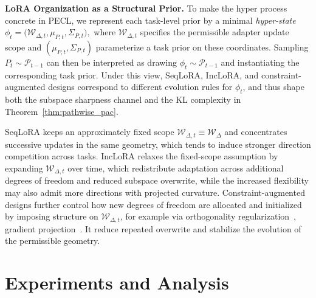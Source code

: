 \documentclass{article}
\theoremstyle{plain}
\theoremstyle{definition}
\theoremstyle{remark}
\begin{document}
\noindent\textbf{LoRA Organization as a Structural Prior.}\quad 
To make the hyper process concrete in PECL, we represent each task-level prior by a minimal \emph{hyper-state}
$
\phi_t = \bigl(\mathcal W_{\Delta,t},\mu_{P,t},\Sigma_{P,t}\bigr),
$
where $\mathcal W_{\Delta,t}$ specifies the permissible adapter update scope and $(\mu_{P,t},\Sigma_{P,t})$ parameterize a task prior on these coordinates.
Sampling $P_t\sim\mathcal P_{t-1}$ can then be interpreted as drawing $\phi_t\sim\mathcal P_{t-1}$ and instantiating the corresponding task prior. Under this view, SeqLoRA, IncLoRA, and constraint-augmented designs correspond to different evolution rules for $\phi_t$, and thus shape both the subspace sharpness channel and the KL complexity in Theorem~\ref{thm:pathwise_pac}.




SeqLoRA keeps an approximately fixed scope $\mathcal W_{\Delta,t}\equiv\mathcal W_\Delta$ and concentrates successive updates in the same geometry, which tends to induce stronger direction competition across tasks.
IncLoRA relaxes the fixed-scope assumption by expanding $\mathcal W_{\Delta,t}$ over time, which redistribute adaptation across additional degrees of freedom and reduced subspace overwrite, while the increased flexibility may also admit more directions with projected curvature.
Constraint-augmented designs further control how new degrees of freedom are allocated and initialized by imposing structure on $\mathcal W_{\Delta,t}$, for example via orthogonality regularization~\cite{wang2023orthogonal}, gradient projection~\citep{liangInfLoRAInterferenceFreeLowRank2024a,yang2024parametercollisionhinderingcontinual}.
It reduce repeated overwrite and stabilize the evolution of the permissible geometry.


\section{Experiments and Analysis}
\end{document}
